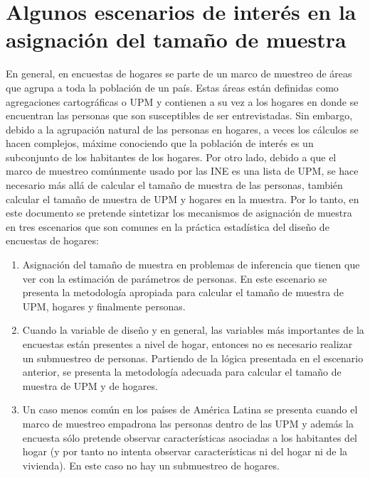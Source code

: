 \documentclass[
  12pt,
]{book}
\begin{document}
\hypertarget{algunos-escenarios-de-interuxe9s-en-la-asignaciuxf3n-del-tamauxf1o-de-muestra}{%
\section{Algunos escenarios de interés en la asignación del tamaño de muestra}\label{algunos-escenarios-de-interuxe9s-en-la-asignaciuxf3n-del-tamauxf1o-de-muestra}}

En general, en encuestas de hogares se parte de un marco de muestreo de áreas que agrupa a toda la población de un país. Estas áreas están definidas como agregaciones cartográficas o UPM y contienen a su vez a los hogares en donde se encuentran las personas que son susceptibles de ser entrevistadas. Sin embargo, debido a la agrupación natural de las personas en hogares, a veces los cálculos se hacen complejos, máxime conociendo que la población de interés es un subconjunto de los habitantes de los hogares. Por otro lado, debido a que el marco de muestreo comúnmente usado por las INE es una lista de UPM, se hace necesario más allá de calcular el tamaño de muestra de las personas, también calcular el tamaño de muestra de UPM y hogares en la muestra. Por lo tanto, en este documento se pretende sintetizar los mecanismos de asignación de muestra en tres escenarios que son comunes en la práctica estadística del diseño de encuestas de hogares:

\begin{enumerate}
\def\labelenumi{\arabic{enumi}.}
\item
  Asignación del tamaño de muestra en problemas de inferencia que tienen que ver con la estimación de parámetros de personas. En este escenario se presenta la metodología apropiada para calcular el tamaño de muestra de UPM, hogares y finalmente personas.
\item
  Cuando la variable de diseño y en general, las variables más importantes de la encuestas están presentes a nivel de hogar, entonces no es necesario realizar un submuestreo de personas. Partiendo de la lógica presentada en el escenario anterior, se presenta la metodología adecuada para calcular el tamaño de muestra de UPM y de hogares.
\item
  Un caso menos común en los países de América Latina se presenta cuando el marco de muestreo empadrona las personas dentro de las UPM y además la encuesta sólo pretende observar características asociadas a los habitantes del hogar (y por tanto no intenta observar características ni del hogar ni de la vivienda). En este caso no hay un submuestreo de hogares.
\end{enumerate}
\end{document}

